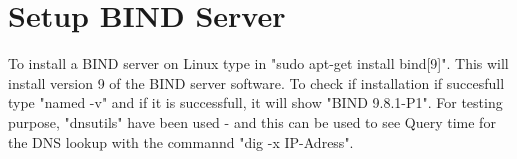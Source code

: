 \documentclass[Preamble]{subfiles}
\begin{document}
\section{Setup BIND Server}
To install a BIND server on Linux type in "sudo apt-get install bind[9]". This will install version 9 of the BIND server software. To check if installation if succesfull type "named -v" and if it is successfull, it will show "BIND 9.8.1-P1". For testing purpose, "dnsutils" have been used - and this can be used to see Query time for the DNS lookup with the commannd "dig -x IP-Adress". 
\end{document}
